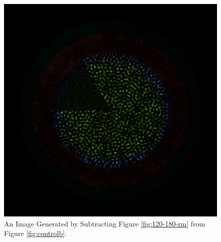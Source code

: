\begin{figure}[H]
\centering
\includegraphics[width=0.6\linewidth]{figures/120-180/diff-120-180}
\caption{An Image Generated by Subtracting Figure \ref{fig:120-180-rm} from Figure \ref{fig:controlb}.}
\label{fig:120-180-diff}
\end{figure}